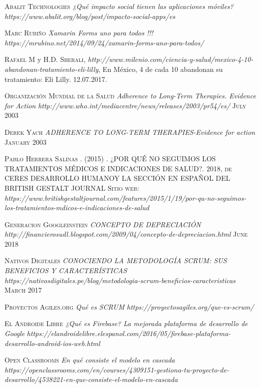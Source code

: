 \begin{thebibliography}{X}
	 \textsc{Abalit Technologies} \textit{¿Qué impacto social tienen las aplicaciones móviles?} \textit{https://www.abalit.org/blog/post/impacto-social-apps/es}
	
	 \textsc{Marc Rubiño} \textit{Xamarin Forms uno para todos !!!} \textit{https://mrubino.net/2014/09/24/xamarin-forms-uno-para-todos/}
	
	 \textsc{Rafael M} y \textsc{H.D. Sherali},
	\textit{http://www.milenio.com/ciencia-y-salud/mexico-4-10-abandonan-tratamiento-eli-lilly},  En México, 4 de cada 10 abandonan su tratamiento: Eli Lilly. 12.07.2017.
	
	 \textsc{Organización Mundial de la Salud} \textit{Adherence to Long-Term Therapies. Evidence for Action} \textit{http://www.who.int/mediacentre/news/releases/2003/pr54/es/} \textsc{July 2003}
	
	 \textsc{Derek Yach} \textit{ADHERENCE TO LONG-TERM THERAPIES-Evidence for action
} \textsc{January 2003}
	
	 \textsc{Pablo Herrera Salinas . (2015)} \textsc{. ¿POR QUÉ NO SEGUIMOS LOS TRATAMIENTOS MÉDICOS E INDICACIONES DE SALUD?. 2018, de CERES DESARROLLO HUMANOY LA SECCIÓN EN ESPAÑOL DEL BRITISH GESTALT JOURNAL Sitio web:} \textit{https://www.britishgestaltjournal.com/features/2015/1/19/por-qu-no-seguimos-los-tratamientos-mdicos-e-indicaciones-de-salud}

	 \textsc{Generacion Googleinstein} \textit{CONCEPTO DE DEPRECIACIÓN} \textit{http://financierosudl.blogspot.com/2009/04/concepto-de-depreciacion.html} \textsc{June 2018}
	
	 \textsc{Nativos Digitales} \textit{CONOCIENDO LA METODOLOGÍA SCRUM: SUS BENEFICIOS Y CARACTERÍSTICAS} \textit{https://nativosdigitales.pe/blog/metodologia-scrum-beneficios-caracteristicas} \textsc{March 2017}
	
	 \textsc{Proyectos Agiles.org} \textit{Qué es SCRUM} \textit{https://proyectosagiles.org/que-es-scrum/} 
	
	 \textsc{El Androide Libre} \textit{¿Qué es Firebase? La mejorada plataforma de desarrollo de Google} \textit{https://elandroidelibre.elespanol.com/2016/05/firebase-plataforma-desarrollo-android-ios-web.html} 
	
	 \textsc{Open Classrooms} \textit{En qué consiste el modelo en cascada} \textit{https://openclassrooms.com/en/courses/4309151-gestiona-tu-proyecto-de-desarrollo/4538221-en-que-consiste-el-modelo-en-cascada} 
	

\end{thebibliography}
